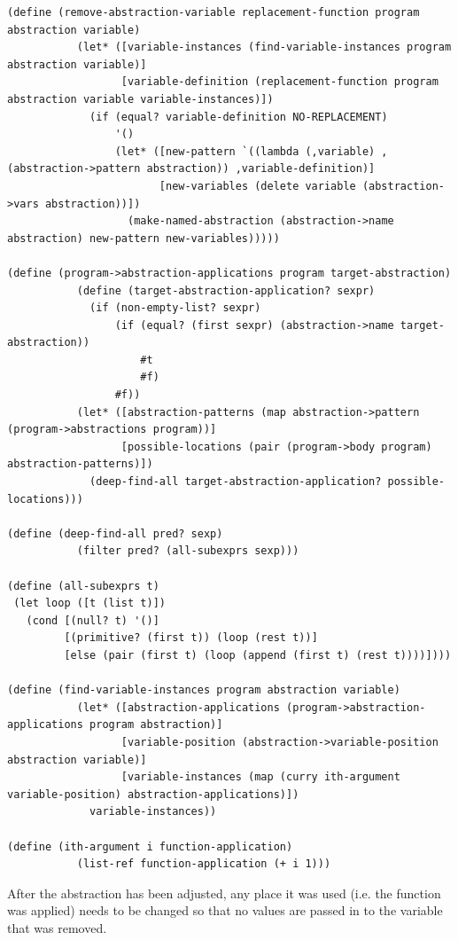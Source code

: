 \documentclass[a4paper,10pt]{article}
\begin{document}
\begin{lstlisting}[frame=trBL]
(define (remove-abstraction-variable replacement-function program abstraction variable)
           (let* ([variable-instances (find-variable-instances program abstraction variable)]
                  [variable-definition (replacement-function program abstraction variable variable-instances)])
             (if (equal? variable-definition NO-REPLACEMENT)
                 '()
                 (let* ([new-pattern `((lambda (,variable) ,(abstraction->pattern abstraction)) ,variable-definition)]
                        [new-variables (delete variable (abstraction->vars abstraction))])
                   (make-named-abstraction (abstraction->name abstraction) new-pattern new-variables)))))

(define (program->abstraction-applications program target-abstraction)
           (define (target-abstraction-application? sexpr)
             (if (non-empty-list? sexpr)
                 (if (equal? (first sexpr) (abstraction->name target-abstraction))
                     #t
                     #f)
                 #f))
           (let* ([abstraction-patterns (map abstraction->pattern (program->abstractions program))]
                  [possible-locations (pair (program->body program) abstraction-patterns)])
             (deep-find-all target-abstraction-application? possible-locations)))

(define (deep-find-all pred? sexp)
           (filter pred? (all-subexprs sexp)))

(define (all-subexprs t)
 (let loop ([t (list t)])
   (cond [(null? t) '()]
         [(primitive? (first t)) (loop (rest t))]
         [else (pair (first t) (loop (append (first t) (rest t))))])))

(define (find-variable-instances program abstraction variable)
           (let* ([abstraction-applications (program->abstraction-applications program abstraction)]
                  [variable-position (abstraction->variable-position abstraction variable)]
                  [variable-instances (map (curry ith-argument variable-position) abstraction-applications)])
             variable-instances))

(define (ith-argument i function-application)
           (list-ref function-application (+ i 1)))

\end{lstlisting}
After the abstraction has been adjusted, any place it was used (i.e. the function was applied) needs to be changed so that no values are passed in to the variable that was removed.
\end{document}
